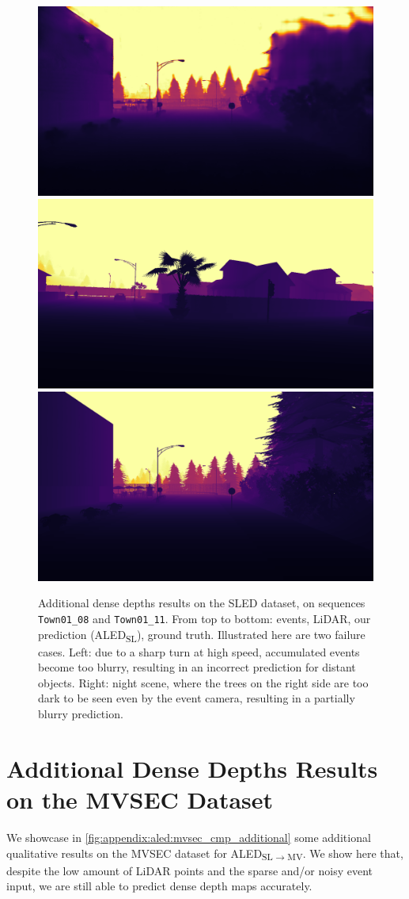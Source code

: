 \begin{figure}
  \includegraphics[width=0.475\linewidth]{mainmatter/figures/b_depth_conv/sled_dense_cmp_additional/prev002216.png}
  \includegraphics[width=0.475\linewidth]{mainmatter/figures/b_depth_conv/sled_dense_cmp_additional/gtprev001630.png}
  \includegraphics[width=0.475\linewidth]{mainmatter/figures/b_depth_conv/sled_dense_cmp_additional/gtprev002216.png}
  \cprotect\caption{Additional dense depths results on the SLED dataset, on sequences \verb|Town01_08| and \verb|Town01_11|. From top to bottom: events, LiDAR, our prediction (ALED\textsubscript{SL}), ground truth. Illustrated here are two failure cases. Left: due to a sharp turn at high speed, accumulated events become too blurry, resulting in an incorrect prediction for distant objects. Right: night scene, where the trees on the right side are too dark to be seen even by the event camera, resulting in a partially blurry prediction.}\label{fig:appendix:aled:sled_cmp_additional_bad}
\end{figure}


\section{Additional Dense Depths Results on the MVSEC Dataset}\label{sec:appendix:aled:mvsec_cmp_additional}
We showcase in \cref{fig:appendix:aled:mvsec_cmp_additional} some additional qualitative results on the MVSEC dataset for ALED\textsubscript{SL\(\rightarrow\)MV}. We show here that, despite the low amount of LiDAR points and the sparse and/or noisy event input, we are still able to predict dense depth maps accurately.

